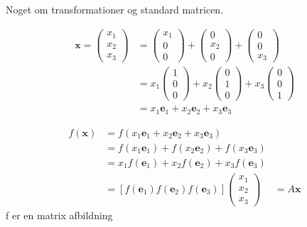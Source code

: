 Noget om transformationer og standard matricen.

\begin{align*}
    \textbf{x}=\begin{pmatrix}x_1 \\x_2 \\ x_3 \end{pmatrix} &= \begin{pmatrix}x_1 \\ 0 \\ 0  \end{pmatrix} + \begin{pmatrix}0 \\ x_2 \\ 0  \end{pmatrix} + \begin{pmatrix}0 \\ 0 \\ x_3  \end{pmatrix}\\ &=
   x_1  \begin{pmatrix}1 \\ 0\\ 0  \end{pmatrix} + x_2 \begin{pmatrix}0 \\ 1 \\ 0  \end{pmatrix} + x_3 \begin{pmatrix}0 \\ 0 \\ 1  \end{pmatrix} \\ &= x_1 \textbf{e}_1 + x_2\textbf{e}_2+x_3 \textbf{e}_3
\end{align*}

\begin{align*}
f(\textbf{x})&=f(x_1 \textbf{e}_1 + x_2\textbf{e}_2+x_3 \textbf{e}_3)\\ &= f(x_1 \textbf{e}_1) + f(x_2 \textbf{e}_2) + f(x_3 \textbf{e}_3) \\ &=x_1 f(\textbf{e}_1) + x_2 f(\textbf{e}_2) + x_3 f(\textbf{e}_3) \\ &= [f(\textbf{e}_1) f(\textbf{e}_2 ) f(\textbf{e}_3)] \begin{pmatrix}x_1 \\x_2 \\ x_3 \end{pmatrix} &= A \textbf{x}
\end{align*}
f er en matrix afbildning

